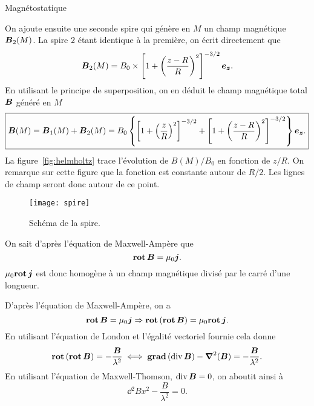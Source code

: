 \begin{corr}{Magnétostatique}
\begin{corrlist}
	  \item On ajoute ensuite une seconde spire qui génère en $M$ un champ magnétique
		$\vecb_2(M)$. La spire $2$ étant identique à la première, on écrit
		directement que
		\begin{equation*}
			\vecb_2(M) = B_0 \times \left[1 + \left(\dfrac{z - R}{R}\right)^2
			\right]^{-3/2}\ez.
		\end{equation*}
		En utilisant le principe de superposition, on en déduit le champ
		magnétique total $\vecb$ généré en $M$
		\begin{equation*}
			\boxed{\vecb(M) = \vecb_1(M) + \vecb_2(M) 
			         = B_0 \left\{\left[1 + \left(\dfrac{z}{R}\right)^2
				 \right]^{-3/2} + \left[1 + \left(\dfrac{z-R}{R}\right)^2
	 \right]^{-3/2}\right\} \ez.}
		\end{equation*} 
		La figure~\ref{fig:helmholtz} trace l'évolution de $B(M)/B_0$ 
		en fonction de $z/R$. On remarque sur cette figure que la fonction est
		constante autour de $R/2$. Les lignes de champ seront donc 
		autour de ce point.

	\end{corrlist}


\begin{figure}[htpb]
	\centering
	\texttt{[image: spire]}
	\caption{Schéma de la spire.}%
	\label{fig:spire_ex}
\end{figure}
\begin{corrlist}
	\item On sait d'après l'équation de Maxwell-Ampère que 
	\begin{equation*}
		\rot \vecb = \mu_0 \vecj.
	\end{equation*}
	$\mu_0 \rot \vecj$ est donc homogène à un champ magnétique divisé par le carré
	d'une longueur. 

	\item D'après l'équation de Maxwell-Ampère, on a
	\begin{equation*}
		\rot \vecb = \mu_0 \vecj \Rightarrow \rot(\rot \vecb) = \mu_0 \rot \vecj.
	\end{equation*}
	En utilisant l'équation de London et l'égalité vectoriel fournie cela donne
	\begin{equation*}
		\rot(\rot \vecb) = -\dfrac{\vecb}{\lambda^2} \iff
		\gradient(\div \vecb) - \laplacien(\vecb) = -\dfrac{\vecb}{\lambda^2}.
	\end{equation*}
	En utilisant l'équation de Maxwell-Thomson, $\div \vecb = 0$, on aboutit ainsi à
	\begin{equation*}
		\boxed{\dd{^2B}{x^2} - \dfrac{B}{\lambda^2} = 0.}
	\end{equation*}


\end{corrlist}
\end{corr}
